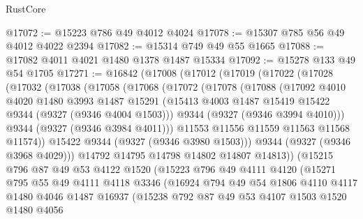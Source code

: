 \begin{lexlean}{RustCore}
\begin{coremodule}
@17072 := @15223 @786 @49 @4012 @4024
@17078 := @15307 @785 @56 @49 @4012 @4022 @2394
@17082 := @15314 @749 @49 @55 @1665
@17088 := @17082 @4011 @4021 @1480 @1378 @1487 @15334
@17092 := @15278 @133 @49 @54 @1705
@17271 := @16842
    (@17008
      (@17012
        (@17019
          (@17022
            (@17028
              (@17032
                (@17038
                  (@17058
                    (@17068
                      (@17072
                        (@17078
                          (@17088
                            (@17092
                              @4010
                              @4020
                              @1480
                              @3993
                              @1487
                              @15291
                              (@15413 @4003 @1487 @15419 @15422 @9344 (@9327 (@9346 @4004 @1503)))
                              @9344
                              (@9327 (@9346 @3994 @4010)))
                            @9344
                            (@9327 (@9346 @3984 @4011)))
                          @11553
                          @11556
                          @11559
                          @11563
                          @11568
                          @11574))
                      @15422
                      @9344
                      (@9327 (@9346 @3980 @1503)))
                    @9344
                    (@9327 (@9346 @3968 @4029)))
                  @14792
                  @14795
                  @14798
                  @14802
                  @14807
                  @14813))
              (@15215
                @796
                @87
                @49
                @53
                @4122
                @1520
                (@15223
                  @796
                  @49
                  @4111
                  @4120
                  (@15271
                    @795
                    @55
                    @49
                    @4111
                    @4118
                    @3346
                    (@16924
                      @794
                      @49
                      @54
                      @1806
                      @4110
                      @4117
                      @1480
                      @4046
                      @1487
                      @16937
                      (@15238
                        @792
                        @87
                        @49
                        @53
                        @4107
                        @1503
                        @1520
                        @1480
                        @4056

\end{coremodule}
\end{lexlean}
